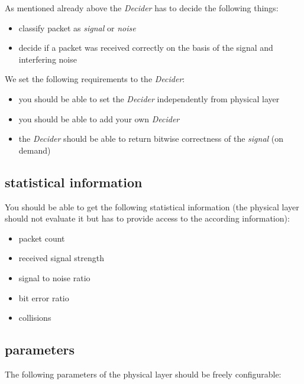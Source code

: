 As mentioned already above the \textit{Decider} has to decide the following
things:

\begin{itemize}
\item classify packet as \textit{signal} or
\textit{noise}
\item decide if a packet was received correctly on the basis of the signal and 
interfering noise
\end{itemize}

We set the following requirements to the \textit{Decider}:

\begin{itemize}
 \item you should be able to set the \textit{Decider} independently from
physical layer
 \item you should be able to add your own
\textit{Decider}
 \item the \textit{Decider} should be able to return bitwise correctness of the
\textit{signal} (on demand)
\end{itemize}


\subsection{statistical information}
\label{statistic}

You should be able to get the following statistical information (the physical
layer should not evaluate it but has to provide access to the according
information):

\begin{itemize}
\item packet count
\item received signal strength
\item signal to noise ratio
\item bit error ratio
\item collisions
\end{itemize}

\subsection{parameters}
\label{parameters}

The following parameters of the physical layer should be freely configurable:

